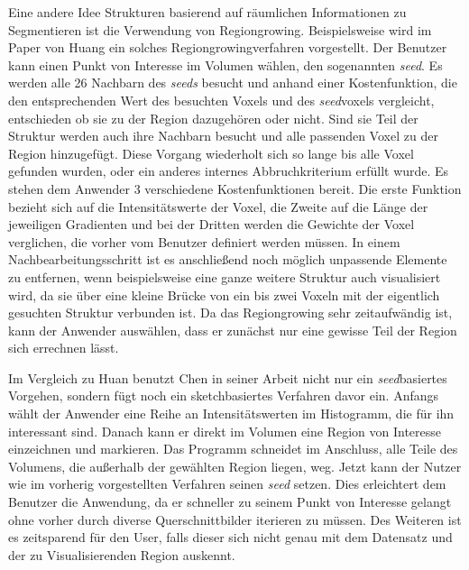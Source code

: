 Eine andere Idee Strukturen basierend auf räumlichen Informationen zu Segmentieren ist die Verwendung von Regiongrowing.
\newline
Beispielsweise wird im Paper von Huang \cite{huang2003rgvis} ein solches Regiongrowingverfahren vorgestellt.
\newline
Der Benutzer kann einen Punkt von Interesse im Volumen wählen, den sogenannten \textit{seed}. Es werden alle 26 Nachbarn des \textit{seeds} besucht und anhand einer Kostenfunktion, die den entsprechenden Wert des besuchten Voxels und des \textit{seed}voxels vergleicht, entschieden ob sie zu der Region dazugehören oder nicht. Sind sie Teil der Struktur werden auch ihre Nachbarn besucht und alle passenden Voxel zu der Region hinzugefügt. Diese Vorgang wiederholt sich so lange bis alle Voxel gefunden wurden, oder ein anderes internes Abbruchkriterium erfüllt wurde.
\newline
Es stehen dem Anwender 3 verschiedene Kostenfunktionen bereit. Die erste Funktion bezieht sich auf die Intensitätswerte der Voxel, die Zweite auf die Länge der jeweiligen Gradienten und bei der Dritten werden die Gewichte der Voxel verglichen, die vorher vom Benutzer definiert werden müssen. In einem Nachbearbeitungsschritt ist es anschließend noch möglich unpassende Elemente zu entfernen, wenn beispielsweise eine ganze weitere Struktur auch visualisiert wird, da sie über eine kleine Brücke von ein bis zwei Voxeln mit der eigentlich gesuchten Struktur verbunden ist.
\newline
Da das Regiongrowing sehr zeitaufwändig ist, kann der Anwender auswählen, dass er zunächst nur eine gewisse Teil der Region sich errechnen lässt.


Im Vergleich zu Huan \cite{huang2003rgvis} benutzt Chen  in seiner Arbeit \cite{chen2006sketch} nicht nur ein \textit{seed}basiertes Vorgehen, sondern fügt noch ein sketchbasiertes Verfahren davor ein.
\newline
Anfangs wählt der Anwender eine Reihe an Intensitätswerten im Histogramm, die für ihn interessant sind. Danach kann er direkt im Volumen eine Region von Interesse einzeichnen und markieren. Das Programm schneidet im Anschluss, alle Teile des Volumens, die außerhalb der gewählten Region liegen, weg. Jetzt kann der Nutzer wie im vorherig vorgestellten Verfahren seinen \textit{seed} setzen.
\newline
Dies erleichtert dem Benutzer die Anwendung, da er schneller zu seinem Punkt von Interesse gelangt ohne vorher durch diverse Querschnittbilder iterieren zu müssen. Des Weiteren ist es zeitsparend für den User, falls dieser sich nicht genau mit dem Datensatz und der zu Visualisierenden Region auskennt.


